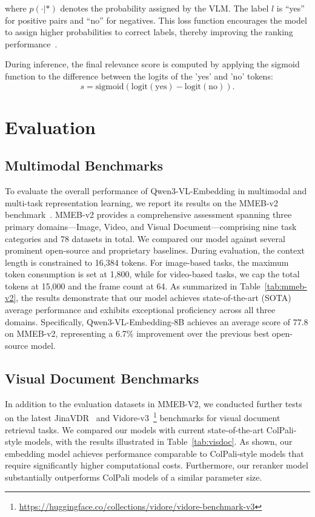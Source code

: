 \documentclass{article} %
\begin{document}
where $p(\cdot|*)$ denotes the probability assigned by the VLM. The label $l$ is ``yes'' for positive pairs and ``no'' for negatives. This loss function encourages the model to assign higher probabilities to correct labels, thereby improving the ranking performance~\citep{dai2025supervised}.

During inference, the final relevance score is computed by applying the sigmoid function to the difference between the logits of the 'yes' and 'no' tokens:
\begin{equation}
    s = \text{sigmoid}(\text{logit}(\text{yes}) - \text{logit}(\text{no})).
\end{equation}

\section{Evaluation}


\subsection{Multimodal Benchmarks}



To evaluate the overall performance of Qwen3-VL-Embedding in multimodal and multi-task representation learning, we report its results on the MMEB-v2 benchmark~\citep{meng2025vlm2vec}. MMEB-v2 provides a comprehensive assessment spanning three primary domains—Image, Video, and Visual Document—comprising nine task categories and 78 datasets in total. We compared our model against several prominent open-source and proprietary baselines. During evaluation, the context length is constrained to 16,384 tokens. For image-based tasks, the maximum token consumption is set at 1,800, while for video-based tasks, we cap the total tokens at 15,000 and the frame count at 64. As summarized in Table~\ref{tab:mmeb-v2}, the results demonstrate that our model achieves state-of-the-art (SOTA) average performance and exhibits exceptional proficiency across all three domains. Specifically, Qwen3-VL-Embedding-8B achieves an average score of 77.8 on MMEB-v2, representing a 6.7\% improvement over the previous best open-source model.

\subsection{Visual Document Benchmarks}

In addition to the evaluation datasets in MMEB-V2, we conducted further tests on the latest JinaVDR~\citep{günther2025jinaembeddingsv4universalembeddingsmultimodal} and Vidore-v3~\footnote{\url{https://huggingface.co/collections/vidore/vidore-benchmark-v3}} benchmarks for visual document retrieval tasks. We compared our models with current state-of-the-art ColPali-style models, with the results illustrated in Table~\ref{tab:visdoc}. As shown, our embedding model achieves performance comparable to ColPali-style models that require significantly higher computational costs. Furthermore, our reranker model substantially outperforms ColPali models of a similar parameter size.
\end{document}

